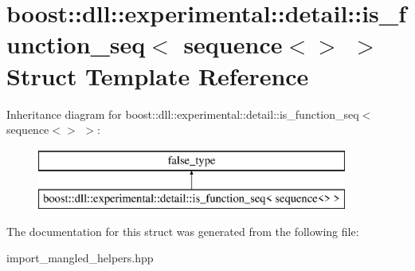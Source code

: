 \hypertarget{a01460}{}\section{boost\+:\+:dll\+:\+:experimental\+:\+:detail\+:\+:is\+\_\+function\+\_\+seq$<$ sequence$<$$>$ $>$ Struct Template Reference}
\label{a01460}
Inheritance diagram for boost\+:\+:dll\+:\+:experimental\+:\+:detail\+:\+:is\+\_\+function\+\_\+seq$<$ sequence$<$$>$ $>$\+:\begin{figure}[H]
\begin{center}
\leavevmode
\includegraphics[height=2.000000cm]{a01460}
\end{center}
\end{figure}


The documentation for this struct was generated from the following file\+:\begin{DoxyCompactItemize}
\item 
import\+\_\+mangled\+\_\+helpers.\+hpp\end{DoxyCompactItemize}
